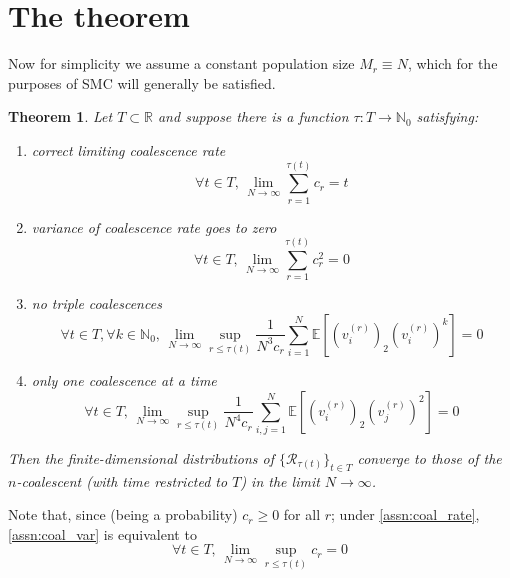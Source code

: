 \documentclass{article}
\newcommand{\E}{\mathbb{E}}
\newtheorem{thm}{Theorem}
\begin{document}
\section*{The theorem}
Now for simplicity we assume a constant population size $M_r \equiv N$, which for the purposes of SMC will generally be satisfied.
\begin{thm}
Let $T \subset \mathbb{R}$ and suppose there is a function $\tau : T \to \mathbb{N}_0$ satisfying:
\begin{enumerate}[label=(\Alph*)]
\item\label{assn:coal_rate} correct limiting coalescence rate
\begin{equation*}
\forall t \in T, \,\lim_{N\to\infty} \sum_{r=1}^{\tau(t)} c_r =t
\end{equation*}

\item\label{assn:coal_var} variance of coalescence rate goes to zero
\begin{equation*}
\forall t \in T, \,\lim_{N\to\infty} \sum_{r=1}^{\tau(t)} c_r^2 =0
\end{equation*}

\item\label{assn:triple_coal} no triple coalescences
\begin{equation*}
\forall t \in T, \forall k\in\mathbb{N}_0,\, \lim_{N\to\infty} \sup_{r\leq\tau(t)} \frac{1}{N^3 c_r} \sum_{i=1}^N \E\left[ (v_i^{(r)})_2 (v_i^{(r)})^k \right] =0
\end{equation*}

\item\label{assn:multi_coal} only one coalescence at a time
\begin{equation*}
\forall t \in T,\, \lim_{N\to\infty} \sup_{r\leq\tau(t)} \frac{1}{N^4 c_r} \sum_{i,j=1}^N \E\left[ (v_i^{(r)})_2 (v_j^{(r)})^2 \right] =0
\end{equation*}
\end{enumerate}
Then the finite-dimensional distributions of $\{\mathcal{R}_{\tau(t)}\}_{t\in T}$ converge to those of the $n$-coalescent (with time restricted to $T$) in the limit $N\to\infty$.
\end{thm}
Note that, since (being a probability) $c_r \geq 0$ for all $r$; under \ref{assn:coal_rate}, \ref{assn:coal_var} is equivalent to
\begin{equation}
\forall t \in T,\, \lim_{N\to\infty} \sup_{r\leq\tau(t)} c_r =0
\end{equation}
\end{document}
